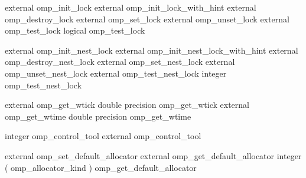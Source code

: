{\begin{ompfSyntax}
     external omp_init_lock
     external omp_init_lock_with_hint
     external omp_destroy_lock
     external omp_set_lock
     external omp_unset_lock
     external omp_test_lock
     logical omp_test_lock

     external omp_init_nest_lock
     external omp_init_nest_lock_with_hint
     external omp_destroy_nest_lock
     external omp_set_nest_lock
     external omp_unset_nest_lock
     external omp_test_nest_lock
     integer omp_test_nest_lock

     external omp_get_wtick
     double precision omp_get_wtick
     external omp_get_wtime
     double precision omp_get_wtime

     integer  omp_control_tool
     external omp_control_tool

     external omp_set_default_allocator
     external omp_get_default_allocator
     integer ( omp_allocator_kind ) omp_get_default_allocator

\end{ompfSyntax}}





\pagebreak
